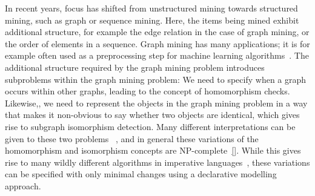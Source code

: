 In recent years, focus has shifted from unstructured mining towards structured mining, such as graph or sequence mining.
Here, the items being mined exhibit additional structure, for example the edge relation in the case of graph mining, or the order of elements in a sequence.
Graph mining has many applications; it is for example often used as a preprocessing step for machine learning algorithms~\citep{pattern_mining_classification}.
The additional structure required by the graph mining problem introduces subproblems within the graph mining problem: We need to specify when a graph occurs within other graphs, leading to the concept of homomorphism checks.
Likewise,, we need to represent the objects in the graph mining problem in a way that makes it non-obvious to say whether two objects are identical, which gives rise to subgraph isomorphism detection.
Many different interpretations can be given to these two problems~ \citep{subtree_overview}, and in general these variations of the homomorphism and isomorphism concepts are NP-complete~\ref{}.
While this gives rise to many wildly different algorithms in imperative languages~\citep{gspan,theta_subsumption}, these variations can be specified with only minimal changes using a declarative modelling approach.

